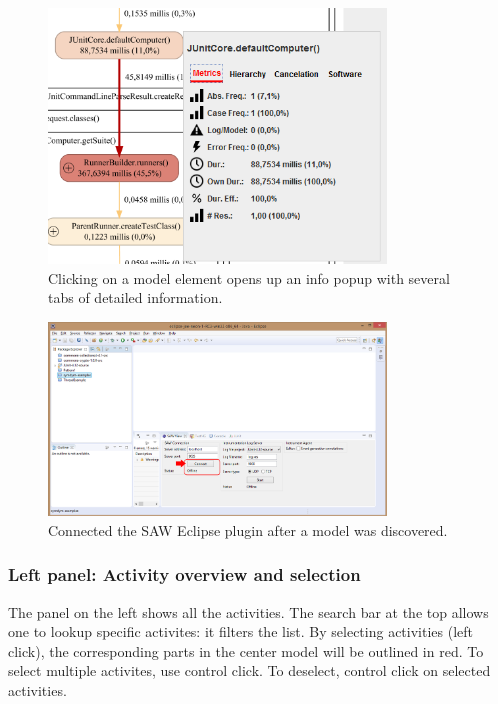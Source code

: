 \documentclass{article}
\begin{document}
\begin{figure}[h!]%
    \centering%
    \includegraphics[width=0.8\textwidth]{gfx/model-popup.png}%
    \caption{Clicking on a model element opens up an info popup with several tabs of detailed information.}%
    \label{fig:screen:popup}%
\end{figure}%

\begin{figure}[h!]
\centering
\includegraphics[width=0.8\textwidth]{gfx/eclipse-connect.png}
\caption{Connected the SAW Eclipse plugin after a model was discovered.}
\label{fig:connect}
\end{figure}

\subsubsection{Left panel: Activity overview and selection}
The panel on the left shows all the activities.
The search bar at the top allows one to lookup specific activites: it filters the list.
By selecting activities (left click), the corresponding parts in the center model will be outlined in red.
To select multiple activites, use control click.
To deselect, control click on selected activities.
\end{document}
